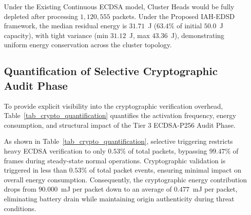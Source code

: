 \documentclass[journal]{IEEEtran}
\begin{document}
Under the Existing Continuous ECDSA model, Cluster Heads would be fully depleted after processing $1,120,555$ packets. Under the Proposed IAH-EDSD framework, the median residual energy is $31.71$~J ($63.4\%$ of initial $50.0$~J capacity), with tight variance (min $31.12$~J, max $43.36$~J), demonstrating uniform energy conservation across the cluster topology.

\subsection{Quantification of Selective Cryptographic Audit Phase}
To provide explicit visibility into the cryptographic verification overhead, Table~\ref{tab_crypto_quantification} quantifies the activation frequency, energy consumption, and structural impact of the Tier 3 ECDSA-P256 Audit Phase.

\begin{table}[htbp]
\caption{Cryptographic Phase Activation and Energy Quantification}
\label{tab_crypto_quantification}
\centering
{}
\end{table}

As shown in Table~\ref{tab_crypto_quantification}, selective triggering restricts heavy ECDSA verification to only $0.53\%$ of total packets, bypassing $99.47\%$ of frames during steady-state normal operations. Cryptographic validation is triggered in less than $0.53\%$ of total packet events, ensuring minimal impact on overall energy consumption. Consequently, the cryptographic energy contribution drops from $90.000$~mJ per packet down to an average of $0.477$~mJ per packet, eliminating battery drain while maintaining origin authenticity during threat conditions.
\end{document}
